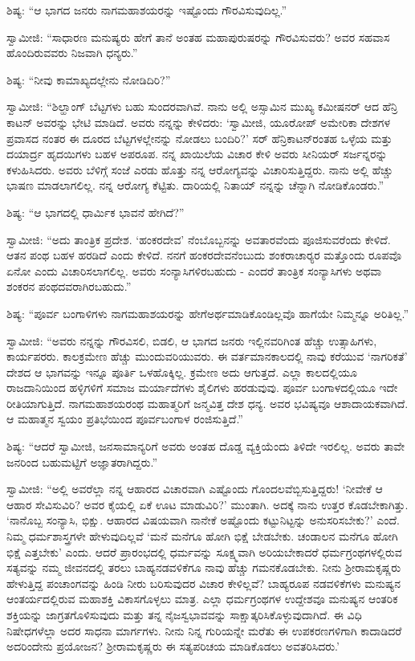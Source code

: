  ಶಿಷ್ಯ: “ಆ ಭಾಗದ ಜನರು ನಾಗಮಹಾಶಯರನ್ನು ಇಷ್ಟೊಂದು ಗೌರವಿಸುವುದಿಲ್ಲ.” 

 ಸ್ವಾಮೀಜಿ: “ಸಾಧಾರಣ ಮನುಷ್ಯರು ಹೇಗೆ ತಾನೆ ಅಂತಹ ಮಹಾಪುರುಷರನ್ನು ಗೌರವಿಸುವರು? ಅವರ ಸಹವಾಸ ಹೊಂದಿರುವವರು ನಿಜವಾಗಿ ಧನ್ಯರು.” 

 ಶಿಷ್ಯ: “ನೀವು ಕಾಮಾಖ್ಯದಲ್ಲೇನು ನೋಡಿದಿರಿ?” 

 ಸ್ವಾಮೀಜಿ: “ಶಿಲ್ಹಾಂಗ್ ಬೆಟ್ಟಗಳು ಬಹು ಸುಂದರವಾಗಿವೆ. ನಾನು ಅಲ್ಲಿ ಅಸ್ಸಾಮಿನ ಮುಖ್ಯ ಕಮೀಷನರ್ ಆದ ಹೆನ್ರಿ ಕಾಟನ್ ಅವರನ್ನು ಭೇಟಿ ಮಾಡಿದೆ. ಅವರು ನನ್ನನ್ನು ಕೇಳಿದರು: ‘ಸ್ವಾಮೀಜಿ, ಯೂರೋಪ್ ಅಮೇರಿಕಾ ದೇಶಗಳ ಪ್ರವಾಸದ ನಂತರ ಈ ದೂರದ ಬೆಟ್ಟಗಳಲ್ಲೇನನ್ನು ನೋಡಲು ಬಂದಿರಿ?’ ಸರ್ ಹೆನ್ರಿಕಾಟನ್‍ರಂತಹ ಒಳ್ಳೆಯ ಮತ್ತು ದಯಾರ್ದ್ರ ಹೃದಯಿಗಳು ಬಹಳ ಅಪರೂಪ. ನನ್ನ ಖಾಯಿಲೆಯ ವಿಚಾರ ಕೇಳಿ ಅವರು ಸೀನಿಯರ್ ಸರ್ಜನ್ನರನ್ನು ಕಳುಹಿಸಿದರು. ಅವರು ಬೆಳಿಗ್ಗೆ ಸಂಜೆ ಎರಡು ಹೊತ್ತು ನನ್ನ ಆರೋಗ್ಯವನ್ನು ವಿಚಾರಿಸುತ್ತಿದ್ದರು. ನಾನು ಅಲ್ಲಿ ಹೆಚ್ಚು ಭಾಷಣ ಮಾಡಲಾಗಲಿಲ್ಲ. ನನ್ನ ಆರೋಗ್ಯ ಕೆಟ್ಟಿತು. ದಾರಿಯಲ್ಲಿ ನಿತಾಯ್ ನನ್ನನ್ನು ಚೆನ್ನಾಗಿ ನೋಡಿಕೊಂಡರು.” 

 ಶಿಷ್ಯ: “ಆ ಭಾಗದಲ್ಲಿ ಧಾರ್ಮಿಕ ಭಾವನೆ ಹೇಗಿದೆ?” 

 ಸ್ವಾಮೀಜಿ: “ಅದು ತಾಂತ್ರಿಕ ಪ್ರದೇಶ. ‘ಹಂಕರದೇವ’ ನೆಂಬೊಬ್ಬನನ್ನು ಅವತಾರವೆಂದು ಪೂಜಿಸುವರೆಂದು ಕೇಳಿದೆ. ಆತನ ಪಂಥ ಬಹಳ ಹರಡಿದೆ ಎಂದು ಕೇಳಿದೆ. ನನಗೆ ಹಂಕರದೇವನೆಂಬುದು ಶಂಕರಾಚಾರ‍್ಯರ ಮತ್ತೊಂದು ರೂಪವೊ ಏನೋ ಎಂದು ವಿಚಾರಿಸಲಾಗಲಿಲ್ಲ. ಅವರು ಸಂನ್ಯಾಸಿಗಳಿರಬಹುದು - ಎಂದರೆ ತಾಂತ್ರಿಕ ಸಂನ್ಯಾಸಿಗಳು ಅಥವಾ ಶಂಕರನ ಪಂಥದವರಾಗಿರಬಹುದು.” 

 ಶಿಷ್ಯ: “ಪೂರ್ವ ಬಂಗಾಳಿಗಳು ನಾಗಮಹಾಶಯರನ್ನು ಹೇಗೆ\break ಅರ್ಥಮಾಡಿಕೊಂಡಿಲ್ಲವೊ ಹಾಗೆಯೇ ನಿಮ್ಮನ್ನೂ ಅರಿತಿಲ್ಲ.” 

\vskip 2pt

 ಸ್ವಾಮೀಜಿ: “ಅವರು ನನ್ನನ್ನು ಗೌರವಿಸಲಿ, ಬಿಡಲಿ, ಆ ಭಾಗದ ಜನರು ಇಲ್ಲಿನವರಿಗಿಂತ ಹೆಚ್ಚು ಉತ್ಸಾಹಿಗಳು, ಕಾರ್ಯಪರರು. ಕಾಲಕ್ರಮೇಣ ಹೆಚ್ಚು ಮುಂದುವರಿಯುವರು. ಈ ವರ್ತಮಾನಕಾಲದಲ್ಲಿ ನಾವು ಕರೆಯುವ ‘ನಾಗರಿಕತೆ’ ದೇಶದ ಆ ಭಾಗವನ್ನು ಇನ್ನೂ ಪೂರ್ತಿ ಒಳಹೊಕ್ಕಿಲ್ಲ. ಕ್ರಮೇಣ ಅದು ಆಗುತ್ತದೆ. ಎಲ್ಲಾ ಕಾಲದಲ್ಲಿಯೂ ರಾಜದಾನಿಯಿಂದ ಹಳ್ಳಿಗಳಿಗೆ ಸಮಾಜ ಮರ್ಯಾದೆಗಳು ಶೈಲಿಗಳು ಹರಡುವುವು. ಪೂರ್ವ ಬಂಗಾಳದಲ್ಲಿಯೂ ಇದೇ ರೀತಿಯಾಗುತ್ತಿದೆ. ನಾಗಮಹಾಶಯರಂಥ ಮಹಾತ್ಮರಿಗೆ ಜನ್ಮವಿತ್ತ ದೇಶ ಧನ್ಯ. ಅವರ ಭವಿಷ್ಯವೂ ಆಶಾದಾಯಕವಾಗಿದೆ. ಆ ಮಹಾತ್ಮನ ಸ್ವಯಂ ಪ್ರತಿಭೆಯಿಂದ ಪೂರ್ವಬಂಗಾಳ ರಂಜಿಸುತ್ತಿದೆ.” 

\vskip 2pt

 ಶಿಷ್ಯ: “ಆದರೆ ಸ್ವಾಮೀಜಿ, ಜನಸಾಮಾನ್ಯರಿಗೆ ಅವರು ಅಂತಹ ದೊಡ್ಡ ವ್ಯಕ್ತಿಯೆಂದು ತಿಳಿದೇ ಇರಲಿಲ್ಲ. ಅವರು ತಾವೇ ಜನರಿಂದ ಬಹುಮಟ್ಟಿಗೆ ಅಜ್ಞಾತರಾಗಿದ್ದರು.” 

\vskip 2pt

 ಸ್ವಾಮೀಜಿ: “ಅಲ್ಲಿ ಅವರೆಲ್ಲಾ ನನ್ನ ಆಹಾರದ ವಿಚಾರವಾಗಿ ಎಷ್ಟೊಂದು ಗೊಂದಲವೆಬ್ಬಿಸುತ್ತಿದ್ದರು! ‘ನೀವೇಕೆ ಆ ಆಹಾರ ಸೇವಿಸುವಿರಿ? ಅವರ ಕೈಯಲ್ಲಿ ಏಕೆ ಊಟ ಮಾಡುವಿರಿ?’ ಮುಂತಾಗಿ. ಅದಕ್ಕೆ ನಾನು ಉತ್ತರ ಕೊಡಬೇಕಾಗಿತ್ತು. ‘ನಾನೊಬ್ಬ ಸಂನ್ಯಾಸಿ, ಭಿಕ್ಷು. ಆಹಾರದ ವಿಷಯವಾಗಿ ನಾನೇಕೆ ಅಷ್ಟೊಂದು ಕಟ್ಟುನಿಟ್ಟನ್ನು ಅನುಸರಿಸಬೇಕು?’ ಎಂದೆ. ನಿಮ್ಮ ಧರ್ಮಶಾಸ್ತ್ರಗಳೇ ಹೇಳುವುದಿಲ್ಲವೆ ‘ಮನೆ ಮನೆಗೂ ಹೋಗಿ ಭಿಕ್ಷೆ ಬೇಡಬೇಕು. ಚಂಡಾಲನ ಮನೆಗೂ ಹೋಗಿ ಭಿಕ್ಷೆ ಎತ್ತಬೇಕು’ ಎಂದು. ಆದರೆ ಪ್ರಾರಂಭದಲ್ಲಿ ಧರ್ಮವನ್ನು ಸೂಕ್ಷ್ಮವಾಗಿ ಅರಿಯಬೇಕಾದರೆ ಧರ್ಮಗ್ರಂಥಗಳಲ್ಲಿರುವ ಸತ್ಯವನ್ನು ನಮ್ಮ ಜೀವನದಲ್ಲಿ ತರಲು ಬಾಹ್ಯನಡವಳಿಕೆಗೂ ನಾವು ಹೆಚ್ಚು ಗಮನಕೊಡಬೇಕು. ನೀನು ಶ‍್ರೀರಾಮಕೃಷ್ಣರು ಹೇಳುತ್ತಿದ್ದ ಪಂಚಾಂಗವನ್ನು ಹಿಂಡಿ ನೀರು ಬರಿಸುವುದರ ವಿಚಾರ ಕೇಳಿಲ್ಲವೆ? ಬಾಹ್ಯರೂಪ ನಡವಳಿಕೆಗಳು ಮನುಷ್ಯನ ಆಂತರ್ಯದಲ್ಲಿರುವ ಮಹಾಶಕ್ತಿ ವಿಕಾಸಗೊಳ್ಳಲು ಮಾತ್ರ. ಎಲ್ಲಾ ಧರ್ಮಗ್ರಂಥಗಳ ಉದ್ದೇಶವೂ‌ ಮನುಷ್ಯನ ಆಂತರಿಕ ಶಕ್ತಿಯನ್ನು ಜಾಗ್ರತಗೊಳಿಸುವುದು ಮತ್ತು ತನ್ನ ನೈಜಸ್ವಭಾವವನ್ನು ಸಾಕ್ಷಾತ್ಕರಿಸಿಕೊಳ್ಳುವುದಾಗಿದೆ. ಈ ವಿಧಿ ನಿಷೇಧಗಳೆಲ್ಲಾ ಅದರ ಸಾಧನಾ ಮಾರ್ಗಗಳು. ನೀನು ನಿನ್ನ ಗುರಿಯನ್ನೇ ಮರೆತು ಈ ಉಪಕರಣಗಳಿಗಾಗಿ ಕಾದಾಡಿದರೆ ಅದರಿಂದೇನು ಪ್ರಯೋಜನ? ಶ‍್ರೀರಾಮಕೃಷ್ಣರು ಈ ಸತ್ಯಪರಿಚಯ ಮಾಡಿಕೊಡಲು ಅವತರಿಸಿದರು.’ 

